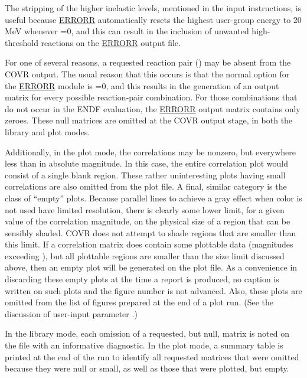 \noindent
The stripping of the higher inelastic levels, mentioned in the input
instructions, is useful because \hyperlink{sERRORRhy}{ERRORR}
automatically resets the
highest user-group energy to 20 MeV whenever =0, and this
can result in the inclusion of unwanted high-threshold reactions on the
\hyperlink{sERRORRhy}{ERRORR} output file.

For one of several reasons, a requested reaction pair
() may be absent from the COVR output.
The usual reason that this occurs is that the normal  option
for the \hyperlink{sERRORRhy}{ERRORR} module is =0,
and this results in the generation of an output matrix for every
possible reaction-pair combination.  For those combinations that
do not occur in the ENDF evaluation, the
\hyperlink{sERRORRhy}{ERRORR} output matrix contains only
zeroes.  These null matrices are omitted at the COVR output stage,
in both the library and plot modes.

Additionally, in the plot mode, the correlations may be nonzero, but
everywhere less than  in absolute magnitude.  In this
case, the entire correlation plot would consist of a single blank region.
These rather uninteresting plots having small correlations are also
omitted from the plot file.  A final, similar category is the class of
``empty'' plots.  Because parallel lines to achieve a gray effect
when color is not used have limited resolution, there
is clearly some lower limit, for a given value of the correlation
magnitude, on the physical size of a region that can be sensibly shaded.
COVR does not attempt to shade regions that are smaller than this limit.
If a correlation matrix does contain some plottable data (magnitudes
exceeding ), but all plottable regions are smaller than
the size limit discussed above, then an empty plot will be generated on
the plot file.  As a convenience in discarding these empty plots at the
time a report is produced, no caption is written on such plots and the
figure number is not advanced.  Also, these plots are omitted from
the list of figures prepared at the end of a plot run.  (See the
discussion of user-input parameter .)

In the library mode, each omission of a requested, but null, matrix is
noted on the  file with an informative diagnostic.  In the
plot mode, a summary table is printed at the end of the run to identify
all requested matrices that were omitted because they were null or
small, as well as those that were plotted, but empty.


